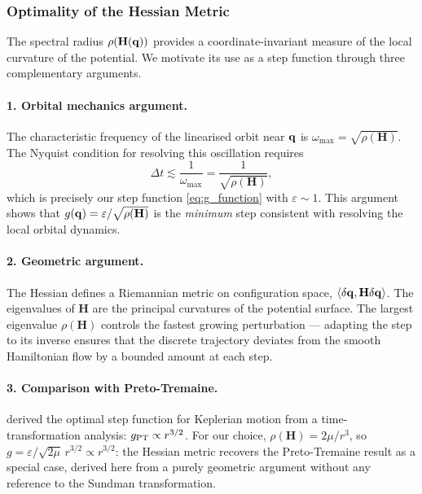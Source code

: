 
\subsubsection{Optimality of the Hessian Metric}
\label{sec:optimality}

The spectral radius $\rho(\mathbf{H}(\mathbf{q}))$ provides a
coordinate-invariant measure of the local curvature of the
potential. We motivate its use as a step function through
three complementary arguments.

\paragraph{1. Orbital mechanics argument.}
The characteristic frequency of the linearised orbit near
$\mathbf{q}$ is $\omega_{\max} = \sqrt{\rho(\mathbf{H})}$.
The Nyquist condition for resolving this oscillation requires
\begin{equation}
  \Delta t \lesssim \frac{1}{\omega_{\max}}
  = \frac{1}{\sqrt{\rho(\mathbf{H})}},
\end{equation}
which is precisely our step function \eqref{eq:g_function} with
$\varepsilon \sim 1$. This argument shows that $g(\mathbf{q}) =
\varepsilon/\sqrt{\rho(\mathbf{H})}$ is the \textit{minimum}
step consistent with resolving the local orbital dynamics.

\paragraph{2. Geometric argument.}
The Hessian defines a Riemannian metric on configuration space,
$\langle\delta\mathbf{q}, \mathbf{H}\delta\mathbf{q}\rangle$. The eigenvalues
of $\mathbf{H}$ are the principal curvatures of the potential
surface. The largest eigenvalue $\rho(\mathbf{H})$ controls the
fastest growing perturbation — adapting the step to its inverse
ensures that the discrete trajectory deviates from the smooth
Hamiltonian flow by a bounded amount at each step.

\paragraph{3. Comparison with Preto-Tremaine.}
\citet{PretoTremaine1999} derived the optimal step function for
Keplerian motion from a time-transformation analysis:
$g_{\rm PT} \propto r^{3/2}$.
For our choice, $\rho(\mathbf{H}) = 2\mu/r^3$, so
$g = \varepsilon/\sqrt{2\mu}\,r^{3/2} \propto r^{3/2}$:
the Hessian metric recovers the Preto-Tremaine result as a
special case, derived here from a purely geometric argument
without any reference to the Sundman transformation.

